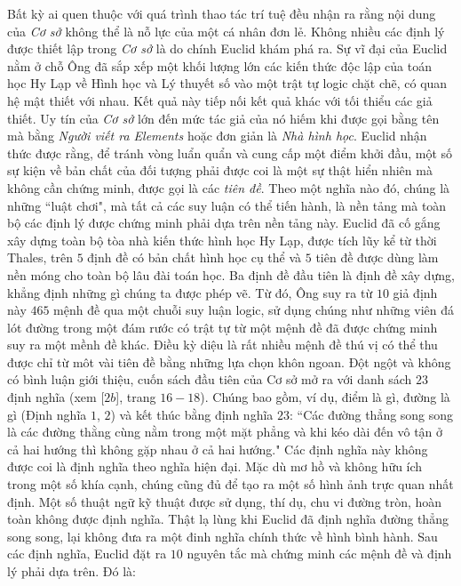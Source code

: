 \begin{multicols}{2}
	\vskip 0.1cm
	Bất kỳ ai quen thuộc với quá trình thao tác trí tuệ đều nhận ra rằng nội dung của \textit{Cơ sở} không thể là nỗ lực của một cá nhân đơn lẻ. Không nhiều các định lý được thiết lập trong \textit{Cơ sở} là do chính Euclid khám phá ra. Sự vĩ đại của Euclid nằm ở chỗ Ông đã sắp xếp một khối lượng lớn các kiến thức độc lập của toán học Hy Lạp về Hình học và Lý thuyết số vào một trật tự logic chặt chẽ, có quan hệ mật thiết với nhau. Kết quả này tiếp nối kết quả khác với tối thiểu các giả thiết. Uy tín của \textit{Cơ sở} lớn đến mức tác giả của nó hiếm khi được gọi bằng tên mà bằng \textit{Người viết ra Elements} hoặc đơn giản là \textit{Nhà hình học}.
	\vskip 0.1cm 
	Euclid nhận thức được rằng, để tránh vòng luẩn quẩn và cung cấp một điểm khởi đầu, một số sự kiện về bản chất của đối tượng phải được coi là một sự thật hiển nhiên mà không cần chứng minh, được gọi là các \textit{tiên đề}. Theo một nghĩa nào đó, chúng là những ``luật chơi", mà tất cả các suy luận có thể tiến hành, là nền tảng mà toàn bộ các định lý được chứng minh phải dựa trên nền tảng này.
	\vskip 0.1cm
	Euclid đã cố gắng xây dựng toàn bộ tòa nhà kiến thức hình học Hy Lạp, được tích lũy kể từ thời Thales, trên $5$ định đề có bản chất hình học cụ thể và $5$ tiên đề được dùng làm nền móng cho toàn bộ lâu đài toán học. Ba định đề đầu tiên là định đề xây dựng, khẳng định những gì chúng ta được phép vẽ. Từ đó, Ông suy ra từ $10$ giả định này $465$ mệnh đề qua một chuỗi suy luận logic, sử dụng chúng như những viên đá lót đường trong một đám rước có trật tự từ một mệnh đề đã được chứng minh suy ra một mềnh đề khác. Điều kỳ diệu là rất nhiều mệnh đề thú vị có thể thu được chỉ từ môt vài tiên đề bằng những lựa chọn khôn ngoan. 
	\vskip 0.1cm
	Đột ngột và không có bình luận giới thiệu, cuốn sách đầu tiên của Cơ sở mở ra với danh sách $23$ định nghĩa (xem [$2b$], trang $16-18$). Chúng bao gồm, ví dụ, điểm là gì, đường là gì (Định nghĩa $1$, $2$) và kết thúc bằng định nghĩa $23$: ``Các đường thẳng song song là các đường thằng cùng nằm trong một mặt phẳng và khi kéo dài đến vô tận ở cả hai hướng thì không gặp nhau ở cả hai hướng." Các định nghĩa này không được coi là định nghĩa theo nghĩa hiện đại. Mặc dù mơ hồ và không hữu ích trong một số khía cạnh, chúng cũng đủ để tạo ra một số hình ảnh trực quan nhất định. Một số thuật ngữ kỹ thuật được sử dụng, thí dụ, chu vi đường tròn, hoàn toàn không được định nghĩa. Thật lạ lùng khi Euclid đã định nghĩa đường thẳng song song, lại không đưa ra một đinh nghĩa chính thức về hình bình hành.
	\vskip 0.1cm
	Sau các định nghĩa, Euclid đặt ra $10$ nguyên tắc mà chứng minh các mệnh đề và định lý phải dựa trên. Đó là:

\end{multicols}
